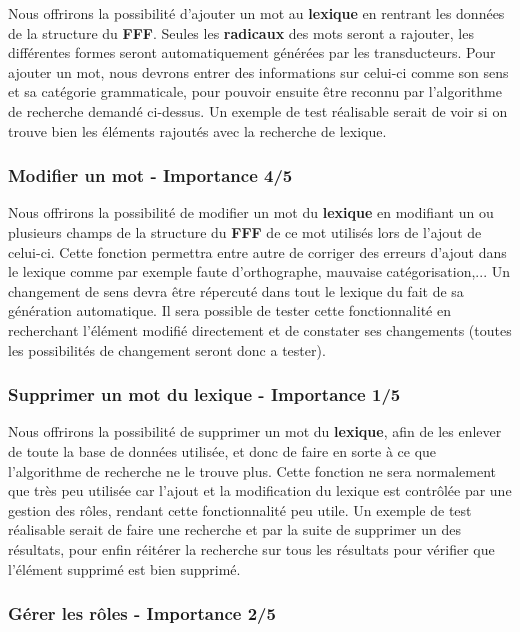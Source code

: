 {{Nous offrirons la possibilité d'ajouter un mot au \textbf{lexique} en rentrant les données de la structure du \textbf{FFF}. Seules les \textbf{radicaux} des mots seront a rajouter, les différentes formes seront automatiquement générées par les transducteurs. Pour ajouter un mot, nous devrons entrer des informations sur celui-ci comme son sens et sa catégorie grammaticale, pour pouvoir ensuite être reconnu par l'algorithme de recherche demandé ci-dessus. Un exemple de test réalisable serait de voir si on trouve bien les éléments rajoutés avec la recherche de lexique.\par}

\subsubsection{Modifier un mot - Importance 4/5}
 
{Nous offrirons la possibilité de modifier un mot du \textbf{lexique} en modifiant un ou plusieurs champs de la structure du \textbf{FFF} de ce mot utilisés lors de l'ajout de celui-ci. Cette fonction permettra entre autre de corriger des erreurs d'ajout dans le lexique comme par exemple faute d'orthographe, mauvaise catégorisation,... Un changement de sens devra être répercuté dans tout le lexique du fait de sa génération automatique. Il sera possible de tester cette fonctionnalité en recherchant l'élément modifié directement et de constater ses changements (toutes les possibilités de changement seront donc a tester).\par}
 
\subsubsection{Supprimer un mot du lexique - Importance 1/5}
{Nous offrirons la possibilité de supprimer un mot du \textbf{lexique}, afin de les enlever de toute la base de données utilisée, et donc de faire en sorte à ce que l'algorithme de recherche ne le trouve plus. Cette fonction ne sera normalement que très peu utilisée car l'ajout et la modification du lexique est contrôlée par une gestion des rôles, rendant cette fonctionnalité peu utile. Un exemple de test réalisable serait de faire une recherche et par la suite de supprimer un des résultats, pour enfin réitérer la recherche sur tous les résultats pour vérifier que l'élément supprimé est bien supprimé.\par}
 
\subsubsection{Gérer les rôles - Importance 2/5}
    
}

